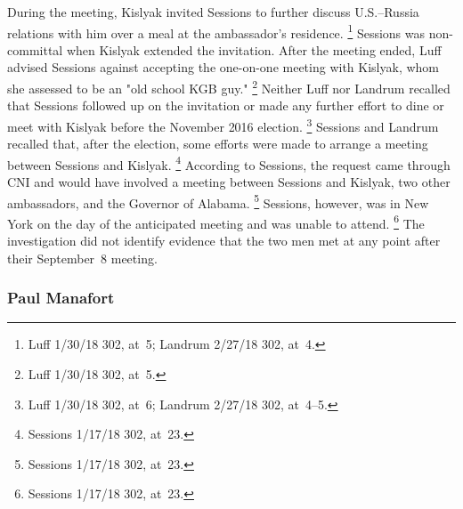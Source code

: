 During the meeting, Kislyak invited Sessions to further discuss U.S.--Russia relations with him over a meal at the ambassador's residence.%
\footnote{Luff 1/30/18 302, at~5;
Landrum 2/27/18 302, at~4.}
Sessions was non-committal when Kislyak extended the invitation.
After the meeting ended, Luff advised Sessions against accepting the one-on-one meeting with Kislyak, whom she assessed to be an "old school KGB guy."%
\footnote{Luff 1/30/18 302, at~5.}
Neither Luff nor Landrum recalled that Sessions followed up on the invitation or made any further effort to dine or meet with Kislyak before the November 2016 election.%
\footnote{Luff 1/30/18 302, at~6;
Landrum 2/27/18 302, at~4--5.}
Sessions and Landrum recalled that, after the election, some efforts were made to arrange a meeting between Sessions and Kislyak.%
\footnote{Sessions 1/17/18 302, at~23.}
According to Sessions, the request came through CNI and would have involved a meeting between Sessions and Kislyak, two other ambassadors, and the Governor of Alabama.%
\footnote{Sessions 1/17/18 302, at~23.}
Sessions, however, was in New York on the day of the anticipated meeting and was unable to attend.%
\footnote{Sessions 1/17/18 302, at~23.}
The investigation did not identify evidence that the two men met at any point after their September~8 meeting.

\subsubsection{Paul Manafort}

